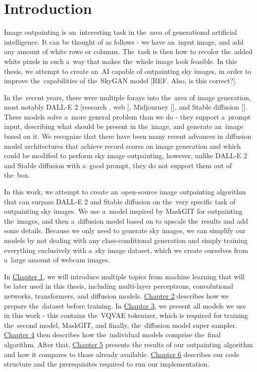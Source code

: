 \chapter*{Introduction}


Image outpainting is an~interesting task in the~area of generational artificial intelligence. It can be thought of as follows - we have an~input image, and add any amount of white rows or columns. The~task is then how to recolor the~added white pixels in such a~way that makes the~whole image look feasible. In this thesis, we attempt to create an~AI capable of outpainting sky images, in order to improve the~capabilities of the~SkyGAN model [REF. Also, is this correct?].

In the~recent years, there were multiple forays into the~area of image generation, most notably DALL-E 2 [research \citep{dalle_2}, web \citep{dalle_2_web}], Midjourney [\citep{midjourney_web}], and Stable diffusion [\citep{stable_diffusion_web}]. These models solve a~more general problem than we do - they support a~prompt input, describing what should be present in the~image, and generate an~image based on it. We recognize that there have been many recent advances in diffusion model architectures that achieve record scores on image generation and which could be modified to perform sky image outpainting, however, unlike DALL-E 2 and Stable diffusion with a~good prompt, they do not support them out of the~box.

In this work, we attempt to create an~open-source image outpainting algorithm that can surpass DALL-E 2 and Stable diffusion on the~very specific task of outpainting sky images. We use a~model inspired by MaskGIT \citep{maskgit} for outpainting the~images, and then a~diffusion model based on \citep{diffusion_super_sampler} to upscale the~results and add some details. Because we only need to generate sky images, we can simplify our models by not dealing with any class-conditional generation and simply training everything exclusively with a~sky image dataset, which we create ourselves from a~large amount of webcam images.

In \hyperref[background]{Chapter 1}, we will introduce multiple topics from machine learning that will be later used in this thesis, including multi-layer perceptrons, convolutional networks, transformers, and diffusion models. \hyperref[dataset]{Chapter 2} describes how we prepare the~dataset before training. In \hyperref[models]{Chapter 3}, we present all models we use in this work - this contains the~VQVAE tokenizer, which is required for training the~second model, MaskGIT, and finally, the~diffusion model super sampler. \hyperref[outpainting]{Chapter 4} then describes how the~individual models comprise the~final algorithm. After that, \hyperref[results]{Chapter 5} presents the results of our outpainting algorithm and how it compares to those already available. \hyperref[code]{Chapter 6} describes our code structure and the prerequisites required to run our implementation.

